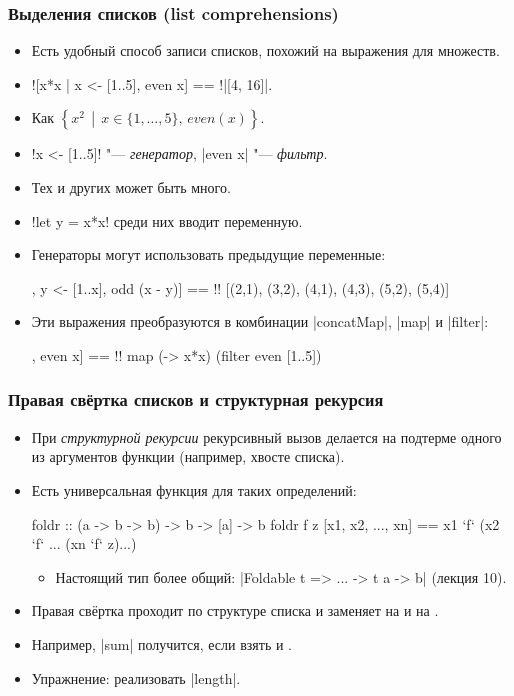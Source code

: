 \documentclass[11pt]{beamer}
\begin{document}
\begin{frame}[fragile]
  \frametitle{Выделения списков (list comprehensions)}
  \begin{itemize}
    \item Есть удобный способ записи списков, похожий на выражения для множеств.
    \item[] \haskinline![x*x | x <- [1..5], even x] == !\pause \haskinline|[4, 16]|.
    \item Как \(\left\{x^2\,\middle|\,x \in \{1, \ldots, 5\},\,even(x)\right\}\).
    \item \haskinline!x <- [1..5]! "--- \emph{генератор}, \haskinline|even x| "--- \emph{фильтр}.
          \pause
    \item Тех и других может быть много.
    \item \haskinline!let y = x*x! среди них вводит переменную.
    \item Генераторы могут использовать предыдущие переменные:
          \begin{haskell}
            [(x, y) | x <- [1..5], y <- [1..x], odd (x - y)] == !\pause!
              [(2,1), (3,2), (4,1), (4,3), (5,2), (5,4)]
          \end{haskell}
    \item Эти выражения преобразуются в комбинации \haskinline|concatMap|, \haskinline|map| и \haskinline|filter|:
          \begin{haskell}
            [x*x | x <- [1..5], even x] == !\pause!
                map (\x -> x*x) (filter even [1..5])
          \end{haskell}
  \end{itemize}
\end{frame}

\begin{frame}[fragile]
  \frametitle{Правая свёртка списков и структурная рекурсия}
  \begin{itemize}
    \item При \emph{структурной рекурсии} рекурсивный вызов делается на подтерме одного из аргументов функции (например, хвосте списка).
    \pause
    \item Есть универсальная функция для таких определений:
          \begin{haskell}
            foldr :: (a -> b -> b) -> b -> [a] -> b
            foldr f z [x1, x2, ..., xn] == 
              x1 `f` (x2 `f` ... (xn `f` z)...)
          \end{haskell}
          \begin{itemize}
            \item Настоящий тип более общий: \haskinline|Foldable t => ... -> t a -> b| (лекция 10).
          \end{itemize}
    \item Правая свёртка проходит по структуре списка и заменяет \haskinline{[]} на  и \haskinline{(:)} на .
    \item Например, \haskinline|sum| получится, если взять  и .
    \item Упражнение: реализовать \haskinline|length|.
  \end{itemize}
\end{frame}
\end{document}
